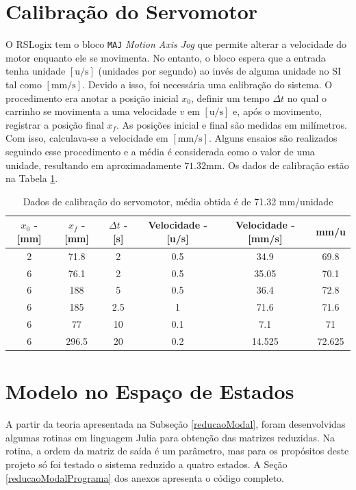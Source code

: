 \section{Calibração do Servomotor\label{calibracaoServomotorSecao}}

O RSLogix tem o bloco \texttt{MAJ} \textendash{} \textit{Motion Axis Jog} \textendash{} que permite alterar a velocidade do motor enquanto ele se movimenta. No entanto, o bloco espera que a entrada tenha unidade $[\mathrm{u}/\mathrm{s}]$ (unidades por segundo) ao invés de alguma unidade no SI tal como $[\mathrm{mm}/\mathrm{s}]$. Devido a isso, foi necessária uma calibração do sistema. O procedimento era anotar a posição inicial $x_0$, definir um tempo $\Delta t$ no qual o carrinho se movimenta a uma velocidade $v$ em $[\mathrm{u}/\mathrm{s}]$ e, após o movimento,  registrar a posição final $x_f$. As posições inicial e final são medidas em milímetros. Com isso, calculava-se a velocidade em $[\mathrm{mm}/\mathrm{s}]$. Alguns ensaios são realizados seguindo esse procedimento e a média é considerada como o valor de uma unidade, resultando em aproximadamente $71.32\mathrm{mm}$. Os dados de calibração estão na Tabela \ref{calibracaoServomotor}.

\begin{table}[!ht]
\centering
\caption{Dados de calibração do servomotor, média obtida é de 71.32 mm/unidade\label{calibracaoServomotor}}
\begin{tabular}{|c|c|c|c|c|c|}
\hline
	$x_0$ - [mm] & $x_f$ - [mm] & $\Delta t$ - [s] & Velocidade - [u/s] & Velocidade - [mm/s] & mm/u\\ \hline
2 &	71.8  &	2   &	0.5 &	34.9   & 	69.8\\ \hline
6 & 76.1  &	2   &	0.5 &	35.05  &	70.1\\ \hline
6 &	188	  &  5   &	0.5	&   36.4   &	72.8\\ \hline
6 &	185   &	2.5 &	1	& 	71.6   &	71.6\\ \hline
6 &	77    &	10  &	0.1	&   7.1    &	71\\ \hline
6 &	296.5 &	20	&   0.2 & 	14.525 &	72.625\\ \hline\end{tabular}
\end{table}

\section{Modelo no Espaço de Estados}

A partir da teoria apresentada na Subseção \ref{reducaoModal}, foram desenvolvidas algumas rotinas em linguagem Julia \cite{julia} para obtenção das matrizes reduzidas. Na rotina, a ordem da matriz de saída é um parâmetro, mas para os propósitos deste projeto só foi testado o sistema reduzido a quatro estados. A Seção \ref{reducaoModalPrograma} dos anexos apresenta o código completo.

